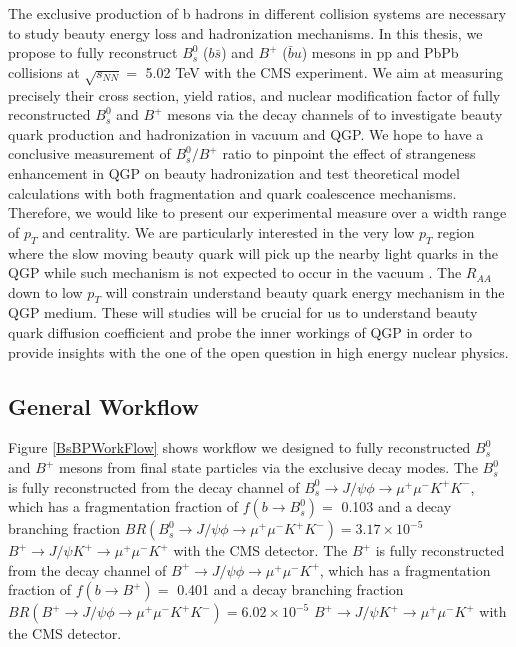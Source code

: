 The exclusive production of b hadrons in different collision systems are necessary to study beauty energy loss and hadronization mechanisms. In this thesis, we propose to fully reconstruct $B^0_s$ ($b\bar s$) and $B^+$ ($\bar b u$) mesons in pp and PbPb collisions at $\sqrt{s_{NN}} = $ 5.02 TeV with the CMS experiment. We aim at measuring precisely their cross section, yield ratios, and nuclear modification factor of fully reconstructed $B^0_s$ and $B^+$ mesons via the decay channels of  to investigate beauty quark production and hadronization in vacuum and QGP. We hope to have a conclusive measurement of $B^0_s/B^+$ ratio to pinpoint the effect of strangeness enhancement in QGP on beauty hadronization and test theoretical model calculations \cite{StrangetoLight} with both fragmentation \cite{} and quark coalescence \cite{} mechanisms. Therefore, we would like to present our experimental measure over a width range of $p_T$ and centrality. We are particularly interested in the very low $p_T$ region where the slow moving beauty quark will pick up the nearby light quarks in the QGP while such mechanism is not expected to occur in the vacuum \cite{}. The $R_{AA}$ down to low $p_T$ will constrain understand beauty quark energy mechanism in the QGP medium. These will studies will be crucial for us to understand beauty quark diffusion coefficient and probe the inner workings of QGP in order to provide insights with the one of the open question in high energy nuclear physics. 

\subsection{General Workflow}

Figure \ref{BsBPWorkFlow} shows workflow we designed to fully reconstructed $B^0_s$ and $B^+$ mesons from final state particles via the exclusive decay modes. The $B^0_s$ is fully reconstructed from the decay channel of $B^0_s \rightarrow J/\psi \phi \rightarrow \mu^+\mu^- K^+K^-$, which has a fragmentation fraction of $f(b\rightarrow B_s^0) =$ 0.103 and a decay branching fraction $BR(B^0_s \rightarrow J/\psi \phi \rightarrow \mu^+\mu^- K^+K^-) = 3.17 \times 10^{-5}$ $B^+ \rightarrow J/\psi K^+\rightarrow \mu^+\mu^- K^+$ with the CMS detector. The $B^+$ is fully reconstructed from the decay channel of $B^+ \rightarrow J/\psi \phi \rightarrow \mu^+\mu^- K^+$, which has a fragmentation fraction of $f(b\rightarrow B^+) =$ 0.401 and a decay branching fraction $BR(B^+ \rightarrow J/\psi \phi \rightarrow \mu^+\mu^- K^+K^-) = 6.02 \times 10^{-5}$ $B^+ \rightarrow J/\psi K^+\rightarrow \mu^+\mu^- K^+$ with the CMS detector. 



